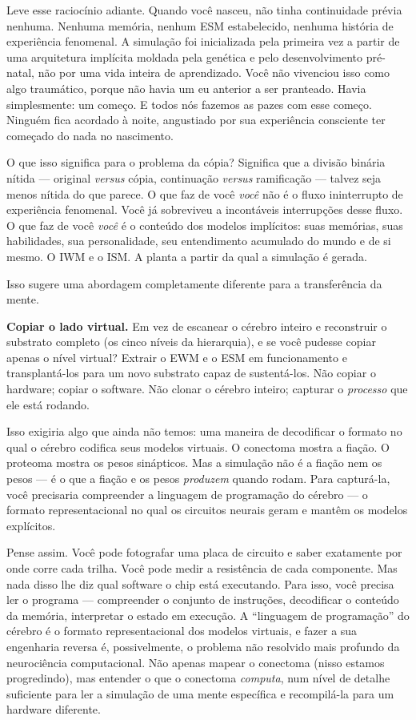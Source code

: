 \documentclass[11pt, twoside, openright]{book}
\begin{document}
Leve esse raciocínio adiante. Quando você nasceu, não tinha continuidade prévia nenhuma. Nenhuma memória, nenhum ESM estabelecido, nenhuma história de experiência fenomenal. A simulação foi inicializada pela primeira vez a partir de uma arquitetura implícita moldada pela genética e pelo desenvolvimento pré-natal, não por uma vida inteira de aprendizado. Você não vivenciou isso como algo traumático, porque não havia um eu anterior a ser pranteado. Havia simplesmente: um começo. E todos nós fazemos as pazes com esse começo. Ninguém fica acordado à noite, angustiado por sua experiência consciente ter começado do nada no nascimento.

O que isso significa para o problema da cópia? Significa que a divisão binária nítida --- original \textit{versus} cópia, continuação \textit{versus} ramificação --- talvez seja menos nítida do que parece. O que faz de você \textit{você} não é o fluxo ininterrupto de experiência fenomenal. Você já sobreviveu a incontáveis interrupções desse fluxo. O que faz de você \textit{você} é o conteúdo dos modelos implícitos: suas memórias, suas habilidades, sua personalidade, seu entendimento acumulado do mundo e de si mesmo. O IWM e o ISM. A planta a partir da qual a simulação é gerada.

Isso sugere uma abordagem completamente diferente para a transferência da mente.

\textbf{Copiar o lado virtual.} Em vez de escanear o cérebro inteiro e reconstruir o substrato completo (os cinco níveis da hierarquia), e se você pudesse copiar apenas o nível virtual? Extrair o EWM e o ESM em funcionamento e transplantá-los para um novo substrato capaz de sustentá-los. Não copiar o hardware; copiar o software. Não clonar o cérebro inteiro; capturar o \textit{processo} que ele está rodando.

Isso exigiria algo que ainda não temos: uma maneira de decodificar o formato no qual o cérebro codifica seus modelos virtuais. O conectoma mostra a fiação. O proteoma mostra os pesos sinápticos. Mas a simulação não é a fiação nem os pesos --- é o que a fiação e os pesos \textit{produzem} quando rodam. Para capturá-la, você precisaria compreender a linguagem de programação do cérebro --- o formato representacional no qual os circuitos neurais geram e mantêm os modelos explícitos.

Pense assim. Você pode fotografar uma placa de circuito e saber exatamente por onde corre cada trilha. Você pode medir a resistência de cada componente. Mas nada disso lhe diz qual software o chip está executando. Para isso, você precisa ler o programa --- compreender o conjunto de instruções, decodificar o conteúdo da memória, interpretar o estado em execução. A ``linguagem de programação'' do cérebro é o formato representacional dos modelos virtuais, e fazer a sua engenharia reversa é, possivelmente, o problema não resolvido mais profundo da neurociência computacional. Não apenas mapear o conectoma (nisso estamos progredindo), mas entender o que o conectoma \textit{computa}, num nível de detalhe suficiente para ler a simulação de uma mente específica e recompilá-la para um hardware diferente.
\end{document}
